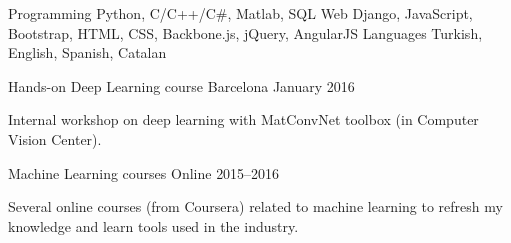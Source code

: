 

\begin{cvskills}
  \cvskill
    {Programming} %
    {Python, C/C++/C\#, Matlab, SQL} %
  \cvskill
    {Web} %
    {Django, JavaScript, Bootstrap, HTML, CSS, Backbone.js, jQuery, AngularJS} %
  \cvskill
    {Languages} %
    {Turkish, English, Spanish, Catalan} %
\end{cvskills}

\begin{cventries}
  \cventrynorole
    {Hands-on Deep Learning course} %
    {Barcelona} %
    {January 2016} %
    {
      \begin{cvitems} %
        \item {Internal workshop on deep learning with MatConvNet toolbox (in Computer Vision Center).}
      \end{cvitems}
    }
  \cventrynorole
    {Machine Learning courses} %
    {Online} %
    {2015--2016} %
    {
      \begin{cvitems} %
        \item {Several online courses (from Coursera) related to machine learning to refresh my knowledge and learn tools used in the industry.}
      \end{cvitems}
    }

\end{cventries}
